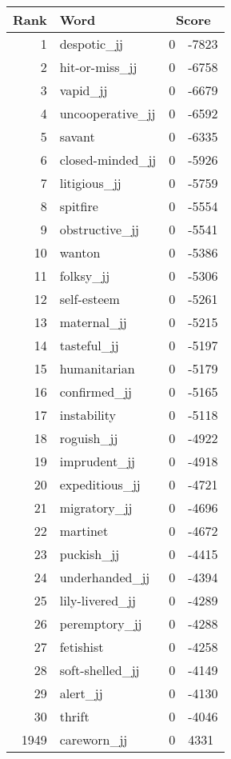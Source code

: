 \begin{longtable}[!htbp]{| rlr@{.}l |}
    \hline
    \textbf{Rank} & \textbf{Word} & \multicolumn{2}{c|}{\textbf{Score}} \\
    \hline
    \endhead
    1 & despotic\_jj & 0 & -7823 \\
    2 & hit-or-miss\_jj & 0 & -6758 \\
    3 & vapid\_jj & 0 & -6679 \\
    4 & uncooperative\_jj & 0 & -6592 \\
    5 & savant & 0 & -6335 \\
    6 & closed-minded\_jj & 0 & -5926 \\
    7 & litigious\_jj & 0 & -5759 \\
    8 & spitfire & 0 & -5554 \\
    9 & obstructive\_jj & 0 & -5541 \\
    10 & wanton & 0 & -5386 \\
    11 & folksy\_jj & 0 & -5306 \\
    12 & self-esteem & 0 & -5261 \\
    13 & maternal\_jj & 0 & -5215 \\
    14 & tasteful\_jj & 0 & -5197 \\
    15 & humanitarian & 0 & -5179 \\
    16 & confirmed\_jj & 0 & -5165 \\
    17 & instability & 0 & -5118 \\
    18 & roguish\_jj & 0 & -4922 \\
    19 & imprudent\_jj & 0 & -4918 \\
    20 & expeditious\_jj & 0 & -4721 \\
    21 & migratory\_jj & 0 & -4696 \\
    22 & martinet & 0 & -4672 \\
    23 & puckish\_jj & 0 & -4415 \\
    24 & underhanded\_jj & 0 & -4394 \\
    25 & lily-livered\_jj & 0 & -4289 \\
    26 & peremptory\_jj & 0 & -4288 \\
    27 & fetishist & 0 & -4258 \\
    28 & soft-shelled\_jj & 0 & -4149 \\
    29 & alert\_jj & 0 & -4130 \\
    30 & thrift & 0 & -4046 \\
    1949 & careworn\_jj & 0 & 4331 \\

\end{longtable}
